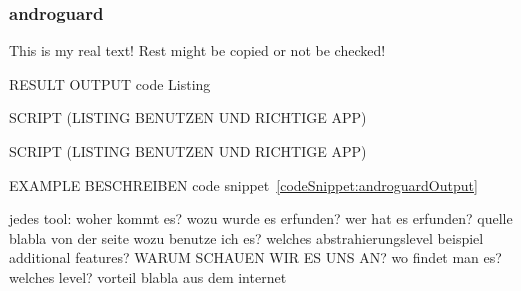 \subsubsection{androguard} \label{subsection:forensics-tools-java-androguard}
This is my real text! Rest might be copied or not be checked!

%


RESULT OUTPUT
code Listing

SCRIPT (LISTING BENUTZEN UND RICHTIGE APP)

SCRIPT (LISTING BENUTZEN UND RICHTIGE APP)

EXAMPLE BESCHREIBEN code snippet~\ref{codeSnippet:androguardOutput}


jedes tool:\newline
woher kommt es?\newline
wozu wurde es erfunden?\newline
wer hat es erfunden? quelle\newline
blabla von der seite\newline
wozu benutze ich es?\newline
welches abstrahierungslevel\newline
beispiel\newline
additional features?\newline
WARUM SCHAUEN WIR ES UNS AN?\newline
wo findet man es?\newline
welches level?\newline
vorteil\newline
blabla aus dem internet\newline
